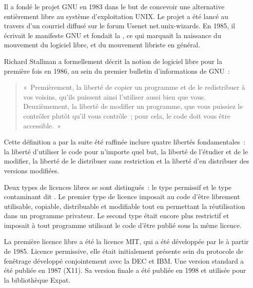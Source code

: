 Il a fondé le projet GNU en 1983 dans le but de concevoir une alternative entièrement libre au système d'exploitation UNIX. Le projet a été lancé au travers d'un courriel diffusé sur le forum Usenet net.unix-wizards. En 1985, il écrivait le manifeste GNU et fondait la , ce qui marquait la naissance du mouvement du logiciel libre, et du mouvement libriste en général.

Richard Stallman a formellement décrit la notion de logiciel libre pour la première fois en 1986, au sein du premier bulletin d'informations de GNU~:

\begin{quote}
«~Premièrement, la liberté de copier un programme et de le redistribuer à vos voisins, qu'ils puissent ainsi l'utiliser aussi bien que vous. Deuxièmement, la liberté de modifier un programme, que vous puissiez le contrôler plutôt qu'il vous contrôle~; pour cela, le code doit vous être accessible.~»
\end{quote}

Cette définition a par la suite été raffinée inclure quatre libertés fondamentales~: la liberté d'utiliser le code pour n'importe quel but, la liberté de l'étudier et de le modifier, la liberté de le distribuer sans restriction et la liberté d'en distribuer des versions modifiées.

Deux types de licences libres se sont distingués~: le type permissif et le type contaminant dit . Le premier type de licence imposait au code d'être librement utilisable, copiable, distribuable et modifiable tout en permettant la réutilisation dans un programme privateur. Le second type était encore plus restrictif et imposait à tout programme utilisant le code d'être publié sous la même licence.

La première licence libre a été la licence MIT, qui a été développée par le  à partir de 1985. Licence permissive, elle était initialement présente sein du protocole de fenêtrage  développé conjointement avec la DEC et IBM. Une version standard a été publiée en 1987 (X11). Sa version finale a été publiée en 1998 et utilisée pour la bibliothèque Expat.

